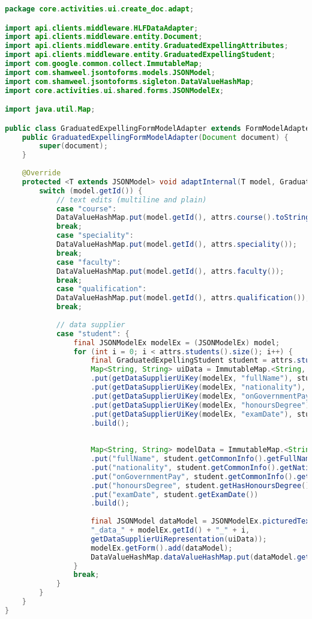 \begin{lstlisting}[language=Java]
package core.activities.ui.create_doc.adapt;

import api.clients.middleware.HLFDataAdapter;
import api.clients.middleware.entity.Document;
import api.clients.middleware.entity.GraduatedExpellingAttributes;
import api.clients.middleware.entity.GraduatedExpellingStudent;
import com.google.common.collect.ImmutableMap;
import com.shamweel.jsontoforms.models.JSONModel;
import com.shamweel.jsontoforms.sigleton.DataValueHashMap;
import core.activities.ui.shared.forms.JSONModelEx;

import java.util.Map;

public class GraduatedExpellingFormModelAdapter extends FormModelAdapter<GraduatedExpellingAttributes> {
	public GraduatedExpellingFormModelAdapter(Document document) {
		super(document);
	}
	
	@Override
	protected <T extends JSONModel> void adaptInternal(T model, GraduatedExpellingAttributes attrs) {
		switch (model.getId()) {
			// text edits (multiline and plain)
			case "course":
			DataValueHashMap.put(model.getId(), attrs.course().toString());
			break;
			case "speciality":
			DataValueHashMap.put(model.getId(), attrs.speciality());
			break;
			case "faculty":
			DataValueHashMap.put(model.getId(), attrs.faculty());
			break;
			case "qualification":
			DataValueHashMap.put(model.getId(), attrs.qualification());
			break;
			
			// data supplier
			case "student": {
				final JSONModelEx modelEx = (JSONModelEx) model;
				for (int i = 0; i < attrs.students().size(); i++) {
					final GraduatedExpellingStudent student = attrs.students().get(i);
					Map<String, String> uiData = ImmutableMap.<String, String>builder()
					.put(getDataSupplierUiKey(modelEx, "fullName"), student.getCommonInfo().getFullName())
					.put(getDataSupplierUiKey(modelEx, "nationality"), student.getCommonInfo().getNationality())
					.put(getDataSupplierUiKey(modelEx, "onGovernmentPay"), HLFDataAdapter.toUserOnGovernmentPay(student.getCommonInfo().getOnGovernmentPay()))
					.put(getDataSupplierUiKey(modelEx, "honoursDegree"), HLFDataAdapter.toUserHonoursDegree(student.getHasHonoursDegree()))
					.put(getDataSupplierUiKey(modelEx, "examDate"), student.getExamDate())
					.build();
					
					
					Map<String, String> modelData = ImmutableMap.<String, String>builder()
					.put("fullName", student.getCommonInfo().getFullName())
					.put("nationality", student.getCommonInfo().getNationality())
					.put("onGovernmentPay", student.getCommonInfo().getOnGovernmentPay().toString())
					.put("honoursDegree", student.getHasHonoursDegree().toString())
					.put("examDate", student.getExamDate())
					.build();
					
					final JSONModel dataModel = JSONModelEx.picturedTextView(
					"_data_" + modelEx.getId() + "_" + i,
					getDataSupplierUiRepresentation(uiData));
					modelEx.getForm().add(dataModel);
					DataValueHashMap.dataValueHashMap.put(dataModel.getId(), getDataSupplierModelRepresentation(modelData));
				}
				break;
			}
		}
	}
}

\end{lstlisting}
